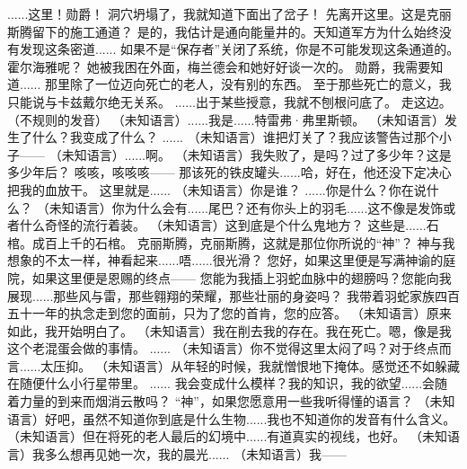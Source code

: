 \documentclass[openany]{book}
\begin{document}
\begin{dialogue}
     ......这里！勋爵！
     洞穴坍塌了，我就知道下面出了岔子！
     先离开这里。这是克丽斯腾留下的施工通道？
     是的，我估计是通向能量井的。天知道军方为什么始终没有发现这条密道......
     如果不是“保存者”关闭了系统，你是不可能发现这条通道的。
     霍尔海雅呢？
     她被我困在外面，梅兰德会和她好好谈一次的。
     勋爵，我需要知道......
     那里除了一位迈向死亡的老人，没有别的东西。
     至于那些死亡的意义，我只能说与卡兹戴尔绝无关系。
     ......出于某些授意，我就不刨根问底了。
     走这边。
     （不规则的发音）
     （未知语言）......我是......特雷弗·弗里斯顿。
     （未知语言）发生了什么？我变成了什么？
     ......
     （未知语言）谁把灯关了？我应该警告过那个小子——
     （未知语言）......啊。
     （未知语言）我失败了，是吗？过了多少年？这是多少年后？
     咳咳，咳咳咳——
     那该死的铁皮罐头......哈，好在，他还没下定决心把我的血放干。
     这里就是......
     （未知语言）你是谁？
     ......你是什么？你在说什么？
     （未知语言）你为什么会有......尾巴？还有你头上的羽毛......这不像是发饰或者什么奇怪的流行着装。
     （未知语言）这到底是个什么鬼地方？
     这些是......石棺。成百上千的石棺。
     克丽斯腾，克丽斯腾，这就是那位你所说的“神”？
     神与我想象的不太一样，神看起来......唔......很光滑？
     您好，如果这里便是写满神谕的庭院，如果这里便是恩赐的终点——
     您能为我插上羽蛇血脉中的翅膀吗？您能向我展现......那些风与雷，那些翱翔的荣耀，那些壮丽的身姿吗？
     我带着羽蛇家族四百五十一年的执念走到您的面前，只为了您的首肯，您的应答。
     （未知语言）原来如此，我开始明白了。
     （未知语言）我在削去我的存在。我在死亡。嗯，像是我这个老混蛋会做的事情。
     ......
     （未知语言）你不觉得这里太闷了吗？对于终点而言......太压抑。
     （未知语言）从年轻的时候，我就憎恨地下掩体。感觉还不如躲藏在随便什么小行星带里。
     ......
     我会变成什么模样？我的知识，我的欲望......会随着力量的到来而烟消云散吗？
     “神”，如果您愿意用一些我听得懂的语言？
     （未知语言）好吧，虽然不知道你到底是什么生物......我也不知道你的发音有什么含义。
     （未知语言）但在将死的老人最后的幻境中......有道真实的视线，也好。
     （未知语言）我多么想再见她一次，我的晨光......
     （未知语言）我——
\end{dialogue}\par
\end{document}
